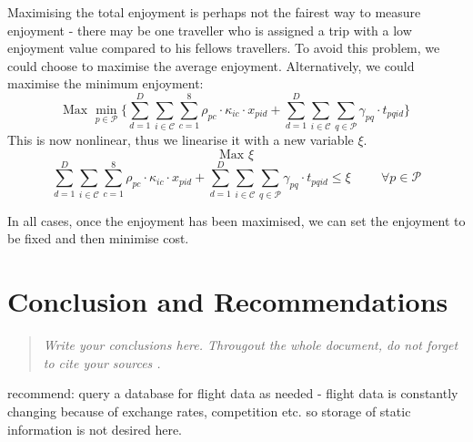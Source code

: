 \documentclass[12pt]{article}
\begin{document}
Maximising the total enjoyment is perhaps not the fairest way to measure enjoyment - there may be one traveller who is assigned a trip with a low enjoyment value compared to his fellows travellers.  To avoid this problem, we could choose to maximise the average enjoyment. Alternatively, we could maximise the minimum enjoyment:
\begin{equation*}
\text{Max   } \min_{p \in \mathcal{P}} \Bigg\{\sum_{d=1}^{D} \sum_{i \in \mathcal{C}} \sum_{c=1}^{8} \rho_{pc} \cdot \kappa_{ic} \cdot x_{pid} + \sum_{d=1}^{D} \sum_{i \in \mathcal{C}} \sum_{q \in \mathcal{P}} \gamma_{pq} \cdot t_{pqid}\Bigg\}
\end{equation*}
This is now nonlinear, thus we linearise it with a new variable $\xi$.
\begin{equation*}
\text{Max  } \xi
\end{equation*}
\begin{equation*}
\sum_{d=1}^{D} \sum_{i \in \mathcal{C}} \sum_{c=1}^{8} \rho_{pc} \cdot \kappa_{ic} \cdot x_{pid} + \sum_{d=1}^{D} \sum_{i \in \mathcal{C}} \sum_{q \in \mathcal{P}} \gamma_{pq} \cdot t_{pqid} \leq \xi \hspace{1cm} \forall p \in \mathcal{P}
\end{equation*}

In all cases, once the enjoyment has been maximised, we can set the enjoyment to be fixed and then minimise cost.



\pagebreak

\section{Conclusion and Recommendations}
\label{sec:conc}


\begin{quote} \textit{
Write your conclusions here. Througout the whole document, do not forget to cite your sources \cite{example}.
} \end{quote}


recommend: query a database for flight data as needed - flight data is constantly changing because of exchange rates, competition etc. so storage of static information is not desired here.
\end{document}
